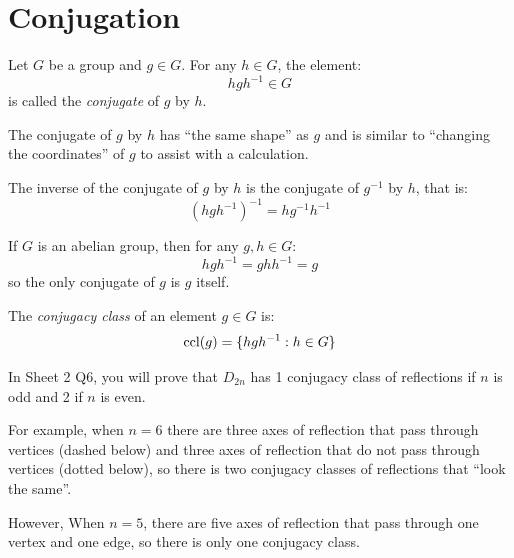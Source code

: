\documentclass[../main.tex]{subfiles}
\begin{document}
\section{Conjugation}
\label{conjugationSec}
\begin{definition}[Conjugate]
  Let $G$ be a group and $g \in G$.
  For any $h \in G$, the element:
  \[
    hgh^{-1} \in G
  \]
  is called the \textit{conjugate} of $g$ by $h$.
\end{definition}
\begin{remark}[Intuition]
  The conjugate of $g$ by $h$ has ``the same shape'' as $g$ and is similar to ``changing the coordinates'' of $g$ to assist with a calculation.
\end{remark}
\begin{remark}
  The inverse of the conjugate of $g$ by $h$ is the conjugate of $g^{-1}$ by $h$, that is:
  \[
    (hgh^{-1})^{-1} = hg^{-1}h^{-1}
  \]
\end{remark}
\begin{example}
  If $G$ is an abelian group, then for any $g, h \in G$:
  \[
    h g h^{-1} = g h h^{-1} = g
  \]
  so the only conjugate of $g$ is $g$ itself.
\end{example}
\begin{definition}
  The \textit{conjugacy class} of an element $g \in G$ is:
  \[
    \operatorname{ccl}(g) = \{h g h^{-1} : h \in G\}
  \]
\end{definition}
\begin{example}
  In Sheet 2 Q6, you will prove that $D_{2n}$ has 1 conjugacy class of reflections if $n$ is odd and 2 if $n$ is even.

  For example, when $n = 6$ there are three axes of reflection that pass through vertices (dashed below) and three axes of reflection that do not pass through vertices (dotted below), so there is two conjugacy classes of reflections that ``look the same''.

  However, When $n = 5$, there are five axes of reflection that pass through one vertex and one edge, so there is only one conjugacy class.
  \begin{center}
  \end{center}
\end{example}
\end{document}
